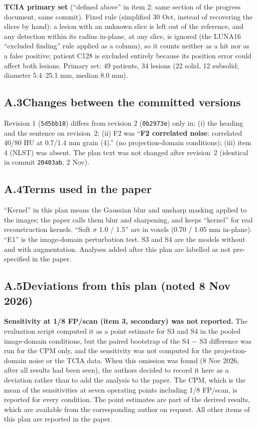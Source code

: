 \textbf{TCIA primary set} (``defined above'' in item 2; same section of the progress document, same commit).
Fixed rule (simplified 30 Oct, instead of recovering the slices by hand): a lesion with an unknown slice is left out of the
reference, and any detection within its radius in-plane, at any slice, is ignored (the LUNA16 ``excluded finding'' rule applied
as a column), so it counts neither as a hit nor as a false positive; patient C128 is excluded entirely because its position
error could affect both lesions. Primary set: 49 patients, 34 lesions (22 solid, 12 subsolid; diameter 5.4--25.1 mm, median
8.0 mm).

\subsection*{A.3\quad Changes between the committed versions}
Revision 1 (\texttt{5d5bb18}) differs from revision 2 (\texttt{0b2973e}) only in: (i) the heading and the sentence on revision~2;
(ii) F2 was ``\textbf{F2 correlated noise}: correlated 40/80 HU at 0.7/1.4 mm grain (4).'' (no projection-domain conditions);
(iii) item 4 (NLST) was absent. The plan text was not changed after revision~2 (identical in commit \texttt{20403ab}, 2 Nov).

\subsection*{A.4\quad Terms used in the paper}
``Kernel'' in this plan means the Gaussian blur and unsharp masking applied to the images; the paper calls them blur and
sharpening, and keeps ``kernel'' for real reconstruction kernels. ``Soft $\sigma$ 1.0 / 1.5'' are in voxels (0.70 / 1.05 mm
in-plane). ``E1'' is the image-domain perturbation test. S3 and S4 are the models without and with augmentation.
Analyses added after this plan are labelled as not pre-specified in the paper.


\subsection*{A.5\quad Deviations from this plan (noted 8 Nov 2026)}
\textbf{Sensitivity at 1/8 FP/scan (item 3, secondary) was not reported.} The evaluation script computed it as a point
estimate for S3 and S4 in the pooled image-domain conditions, but the paired bootstrap of the S4 $-$ S3 difference was run
for the CPM only, and the sensitivity was not computed for the projection-domain noise or the TCIA data. When this omission
was found (8 Nov 2026, after all results had been seen), the authors decided to record it here as a deviation rather than to
add the analysis to the paper. The CPM, which is the mean of the sensitivities at seven operating points including
1/8 FP/scan, is reported for every condition. The point estimates are part of the derived results, which are available
from the corresponding author on request.
All other items of this plan are reported in the paper.
